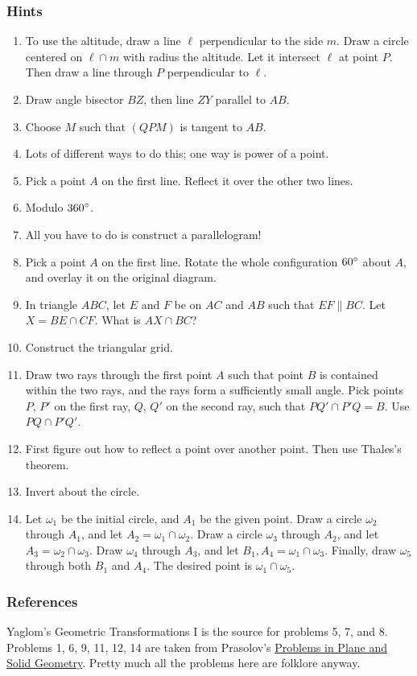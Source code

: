 \documentclass[11pt,paper=letter]{scrartcl}
\begin{document}
\subsubsection*{Hints}

\begin{enumerate}
  \item To use the altitude, draw a line $\ell$ perpendicular to the side $m$. Draw a circle centered on $\ell \cap m$ with radius the altitude. Let it intersect $\ell$ at point $P$. Then draw a line through $P$ perpendicular to $\ell$.

  \item Draw angle bisector $BZ$, then line $ZY$ parallel to $AB$.

  \item Choose $M$ such that $(QPM)$ is tangent to $AB$.

  \item Lots of different ways to do this; one way is power of a point.

  \item Pick a point $A$ on the first line. Reflect it over the other two lines.

  \item Modulo $360^\circ$.

  \item All you have to do is construct a parallelogram!

  \item Pick a point $A$ on the first line. Rotate the whole configuration $60^\circ$ about $A$, and overlay it on the original diagram.

  \item In triangle $ABC$, let $E$ and $F$ be on $AC$ and $AB$ such that $EF \parallel BC$. Let $X = BE \cap CF$. What is $AX \cap BC$?

  \item Construct the triangular grid.

  \item Draw two rays through the first point $A$ such that point $B$ is contained within the two rays, and the rays form a sufficiently small angle. Pick points $P$, $P'$ on the first ray, $Q$, $Q'$ on the second ray, such that $PQ' \cap P'Q = B$. Use $PQ \cap P'Q'$.

  \item First figure out how to reflect a point over another point. Then use Thales's theorem.

  \item Invert about the circle.

  \item Let $\omega_1$ be the initial circle, and $A_1$ be the given point. Draw a circle $\omega_2$ through $A_1$, and let $A_2 = \omega_1 \cap \omega_2$. Draw a circle $\omega_3$ through $A_2$, and let $A_3 = \omega_2 \cap \omega_3$. Draw $\omega_4$ through $A_3$, and let $B_1, A_4 = \omega_1 \cap \omega_3$. Finally, draw $\omega_5$ through both $B_1$ and $A_4$. The desired point is $\omega_1 \cap \omega_5$.
\end{enumerate}

\subsubsection*{References}

Yaglom's Geometric Transformations I is the source for problems 5, 7, and 8. Problems 1, 6, 9, 11, 12, 14 are taken from Prasolov's \href{http://e.math.hr/afine/planegeo.pdf}{Problems in Plane and Solid Geometry}. Pretty much all the problems here are folklore anyway.
\end{document}

